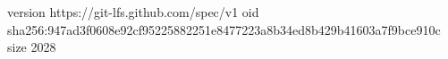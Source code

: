 version https://git-lfs.github.com/spec/v1
oid sha256:947ad3f0608e92cf95225882251e8477223a8b34ed8b429b41603a7f9bce910c
size 2028
